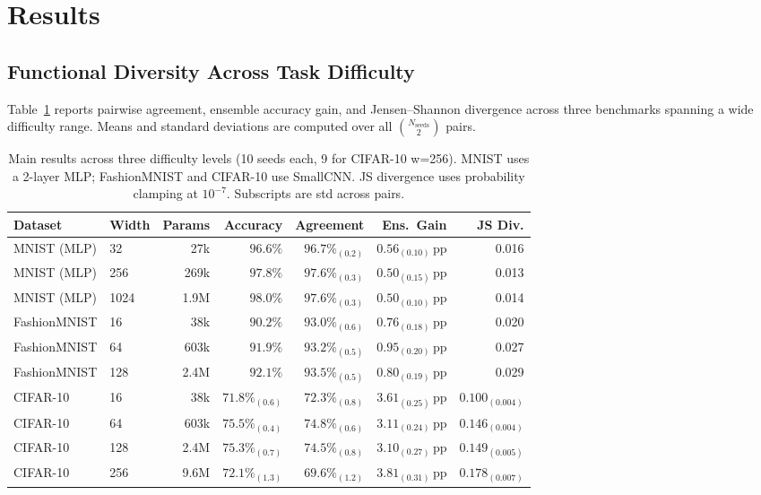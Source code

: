 \documentclass[11pt]{article}
\begin{document}
\section{Results}
\label{sec:results}

\subsection{Functional Diversity Across Task Difficulty}
\label{sec:diversity}

Table~\ref{tab:main} reports pairwise agreement, ensemble accuracy gain,
and Jensen--Shannon divergence across three benchmarks spanning a wide
difficulty range.  Means and standard deviations are computed over all
$\binom{N_\mathrm{seeds}}{2}$ pairs.

\begin{table}[h]
\centering
\small
\setlength{\tabcolsep}{4pt}
\begin{tabular}{llrrrrr}
\toprule
Dataset & Width & Params & Accuracy & Agreement & Ens.\ Gain & JS Div.\\
\midrule
MNIST (MLP) & 32   & 27k  & $96.6\%$ & $96.7\%_{(0.2)}$ & $0.56_{(0.10)}$\,pp & 0.016\\
MNIST (MLP) & 256  & 269k & $97.8\%$ & $97.6\%_{(0.3)}$ & $0.50_{(0.15)}$\,pp & 0.013\\
MNIST (MLP) & 1024 & 1.9M & $98.0\%$ & $97.6\%_{(0.3)}$ & $0.50_{(0.10)}$\,pp & 0.014\\
\midrule
FashionMNIST & 16  & 38k   & $90.2\%$ & $93.0\%_{(0.6)}$ & $0.76_{(0.18)}$\,pp & 0.020\\
FashionMNIST & 64  & 603k  & $91.9\%$ & $93.2\%_{(0.5)}$ & $0.95_{(0.20)}$\,pp & 0.027\\
FashionMNIST & 128 & 2.4M  & $92.1\%$ & $93.5\%_{(0.5)}$ & $0.80_{(0.19)}$\,pp & 0.029\\
\midrule
CIFAR-10 & 16  & 38k  & $71.8\%_{(0.6)}$ & $72.3\%_{(0.8)}$ & $3.61_{(0.25)}$\,pp & $0.100_{(0.004)}$\\
CIFAR-10 & 64  & 603k & $75.5\%_{(0.4)}$ & $74.8\%_{(0.6)}$ & $3.11_{(0.24)}$\,pp & $0.146_{(0.004)}$\\
CIFAR-10 & 128 & 2.4M & $75.3\%_{(0.7)}$ & $74.5\%_{(0.8)}$ & $3.10_{(0.27)}$\,pp & $0.149_{(0.005)}$\\
CIFAR-10 & 256 & 9.6M & $72.1\%_{(1.3)}$ & $69.6\%_{(1.2)}$ & $3.81_{(0.31)}$\,pp & $0.178_{(0.007)}$\\
\bottomrule
\end{tabular}
\caption{Main results across three difficulty levels (10 seeds each, 9 for CIFAR-10 w=256).
MNIST uses a 2-layer MLP; FashionMNIST and CIFAR-10 use SmallCNN.
JS divergence uses probability clamping at $10^{-7}$.  Subscripts are std across pairs.}
\label{tab:main}
\end{table}
\end{document}
